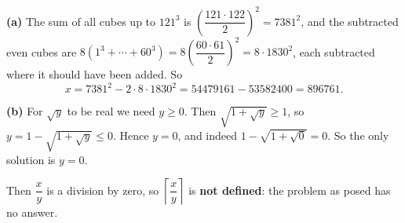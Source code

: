 \textbf{(a)} The sum of all cubes up to $121^3$ is $\left(\dfrac{121\cdot122}{2}\right)^2=7381^2$, and the subtracted even cubes are $8\left(1^3+\cdots+60^3\right)=8\left(\dfrac{60\cdot61}{2}\right)^2=8\cdot1830^2$, each subtracted where it should have been added. So
\[x=7381^2-2\cdot8\cdot1830^2=54479161-53582400=\boxed{896761}.\]

\textbf{(b)} For $\sqrt y$ to be real we need $y\ge0$. Then $\sqrt{1+\sqrt y}\ge1$, so $y=1-\sqrt{1+\sqrt y}\le0$. Hence $y=0$, and indeed $1-\sqrt{1+\sqrt0}=0$. So the only solution is $\boxed{y=0}$.

Then $\dfrac xy$ is a division by zero, so $\left\lceil\dfrac xy\right\rceil$ is \textbf{not defined}: the problem as posed has no answer.
